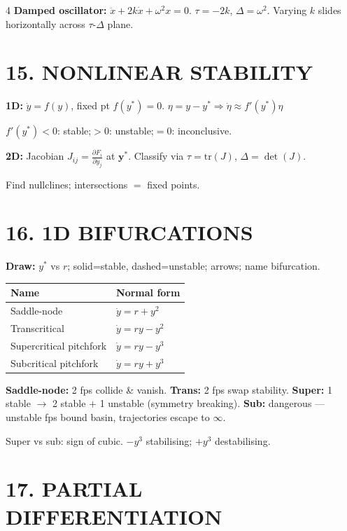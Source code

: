 \documentclass[8pt,a4paper,landscape]{extarticle}
\newcommand{\pf}[2]{\frac{\partial #1}{\partial #2}}
\begin{document}
\begin{multicols}{4}
\textbf{Damped oscillator:} $\ddot x+2k\dot x+\omega^2 x=0$. $\tau=-2k$, $\Delta=\omega^2$. Varying $k$ slides horizontally across $\tau$-$\Delta$ plane.

\section*{15. NONLINEAR STABILITY}

\textbf{1D:} $\dot y=f(y)$, fixed pt $f(y^*)=0$.
$\eta=y-y^*\Rightarrow\dot\eta\approx f'(y^*)\eta$

$f'(y^*)<0$: stable;\quad $>0$: unstable;\quad $=0$: inconclusive.

\textbf{2D:} Jacobian $J_{ij}=\pf{F_i}{y_j}$ at $\mathbf{y}^*$. Classify via $\tau=\mathrm{tr}(J)$, $\Delta=\det(J)$.

Find nullclines; intersections $=$ fixed points.

\section*{16. 1D BIFURCATIONS}

\textbf{Draw:} $y^*$ vs $r$; solid=stable, dashed=unstable; arrows; name bifurcation.

\begin{tabular}{@{}p{1.6cm}p{2.4cm}@{}}
\toprule
Name & Normal form \\
\midrule
Saddle-node & $\dot y=r+y^2$ \\
Transcritical & $\dot y=ry-y^2$ \\
Supercritical pitchfork & $\dot y=ry-y^3$ \\
Subcritical pitchfork & $\dot y=ry+y^3$ \\
\bottomrule
\end{tabular}

\textbf{Saddle-node:} 2 fps collide \& vanish. \textbf{Trans:} 2 fps swap stability. \textbf{Super:} 1 stable $\to$ 2 stable $+$ 1 unstable (symmetry breaking). \textbf{Sub:} dangerous --- unstable fps bound basin, trajectories escape to $\infty$.

Super vs sub: sign of cubic. $-y^3$ stabilising; $+y^3$ destabilising.

\section*{17. PARTIAL DIFFERENTIATION}


\end{multicols}
\end{document}
